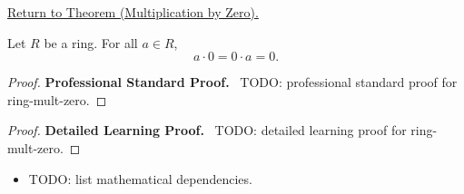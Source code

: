 \newpage
{}
\label{prf:ring-mult-zero}

\begin{remark*}[Return]
\hyperref[prop:ring-mult-zero]{Return to Theorem (Multiplication by Zero).}
\end{remark*}

\begin{theorem*}
Let $R$ be a ring. For all $a \in R$,
\[
a \cdot 0 = 0 \cdot a = 0.
\]
\end{theorem*}

\begin{proof}
\textbf{Professional Standard Proof.}~
TODO: professional standard proof for ring-mult-zero.
\end{proof}

\begin{proof}
\textbf{Detailed Learning Proof.}~
TODO: detailed learning proof for ring-mult-zero.
\end{proof}

\begin{remark*}
\end{remark*}

\begin{dependencies}
\begin{itemize}
  \item TODO: list mathematical dependencies.
\end{itemize}
\end{dependencies}

\clearpage
